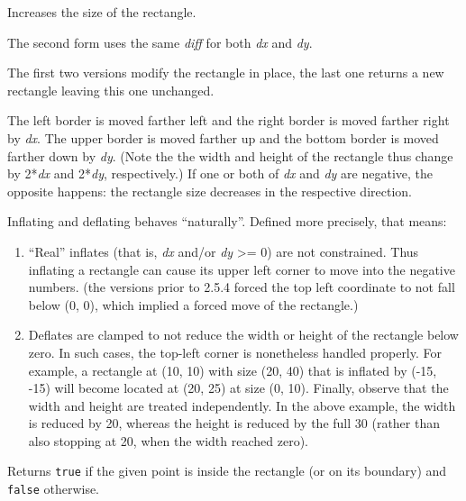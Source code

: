 Increases the size of the rectangle.

The second form uses the same {\it diff} for both {\it dx} and {\it dy}.

The first two versions modify the rectangle in place, the last one returns a
new rectangle leaving this one unchanged.

The left border is moved farther left and the right border is moved farther
right by {\it dx}. The upper border is moved farther up and the bottom border
is moved farther down by {\it dy}. (Note the the width and height of the
rectangle thus change by 2*{\it dx} and 2*{\it dy}, respectively.) If one or
both of {\it dx} and {\it dy} are negative, the opposite happens: the rectangle
size decreases in the respective direction.

Inflating and deflating behaves ``naturally''. Defined more precisely, that
means:
\begin{enumerate}
    \item ``Real'' inflates (that is, {\it dx} and/or {\it dy} >= 0) are not
        constrained. Thus inflating a rectangle can cause its upper left corner
        to move into the negative numbers. (the versions prior to 2.5.4 forced
        the top left coordinate to not fall below (0, 0), which implied a
        forced move of the rectangle.)

    \item Deflates are clamped to not reduce the width or height of the
        rectangle below zero. In such cases, the top-left corner is nonetheless
        handled properly. For example, a rectangle at (10, 10) with size (20,
        40) that is inflated by (-15, -15) will become located at (20, 25) at
        size (0, 10). Finally, observe that the width and height are treated
        independently. In the above example, the width is reduced by 20,
        whereas the height is reduced by the full 30 (rather than also stopping
        at 20, when the width reached zero).
\end{enumerate}




\label{wxrectinside}



Returns {\tt true} if the given point is inside the rectangle (or on its
boundary) and {\tt false} otherwise.


